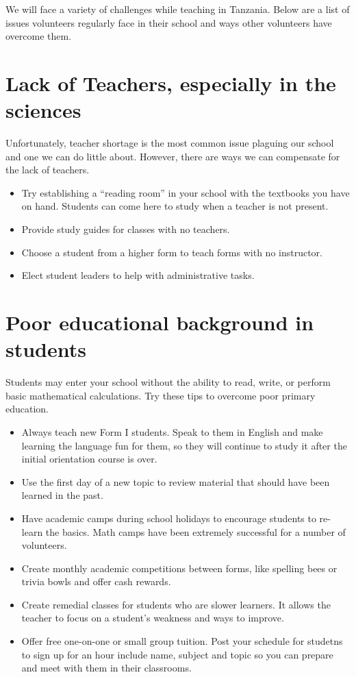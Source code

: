 We will face a variety of challenges while teaching in Tanzania.  Below are a list of issues volunteers regularly face in their school and ways other volunteers have overcome them. 

\section{Lack of Teachers, especially in the sciences}
Unfortunately, teacher shortage is the most common issue plaguing our school and one we can do little about.  However, there are ways we can compensate for the lack of teachers.

\begin{itemize} 
 \item Try establishing a ``reading room'' in your school with the textbooks you have on hand.  Students can come here to study when a teacher is not present. 
 \item Provide study guides for classes with no teachers.
 \item Choose a student from a higher form to teach forms with no instructor.
 \item Elect student leaders to help with administrative tasks.
\end{itemize}

\section{Poor educational background in students}
Students may enter your school without the ability to read, write, or perform basic mathematical calculations.  Try these tips to overcome poor primary education.

\begin{itemize}
 \item Always teach new Form I students.  Speak to them in English and make learning the language fun for them, so they will continue to study it after the initial orientation course is over. \
 \item Use the first day of a new topic to review material that should have been learned in the past. 
 \item Have academic camps during school holidays to encourage students to re-learn the basics. Math camps have been extremely successful for a number of volunteers.
 \item Create monthly academic competitions between forms, like spelling bees or trivia bowls and offer cash rewards.
 \item Create remedial classes for students who are slower learners.  It allows the teacher to focus on a student's weakness and ways to improve.
 \item Offer free one-on-one or small group tuition. Post your schedule for studetns to sign up for an hour include name, subject and topic so you can prepare and meet with them in their classrooms.
\end{itemize}

